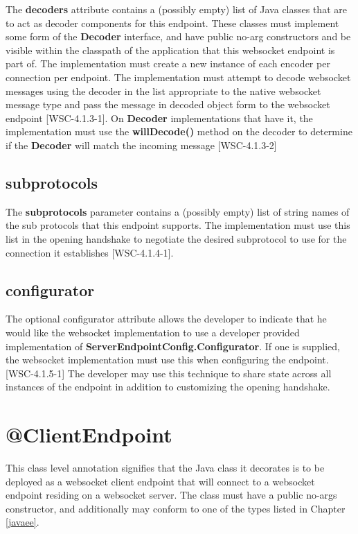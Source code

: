 The \textbf{decoders} attribute contains a (possibly empty) list of Java classes that are to act as decoder components for this endpoint. These classes must implement some form of the \textbf{Decoder} interface, and have public no-arg constructors and be visible within the classpath of the application that this websocket endpoint is part of. The implementation must create a new instance of each encoder per connection per endpoint. The implementation must attempt to decode websocket messages using the decoder in the list appropriate to the native websocket message type and pass the message in decoded object form to the websocket endpoint [WSC-4.1.3-1]. On \textbf{Decoder} implementations that have it, the implementation must use the \textbf{willDecode()} method on the decoder to determine if the \textbf{Decoder} will match the incoming message [WSC-4.1.3-2]

\subsection{subprotocols}

The \textbf{subprotocols} parameter contains a (possibly empty) list of string names of the sub protocols that this endpoint supports. The implementation must use this list in the opening handshake to negotiate the desired subprotocol to use for the connection it establishes [WSC-4.1.4-1].

\subsection{configurator}

The optional configurator attribute allows the developer to indicate that he would like the websocket implementation to use a developer provided implementation of \textbf{ServerEndpointConfig.Configurator}. If one is supplied, the websocket implementation must use this when configuring the endpoint. [WSC-4.1.5-1] The developer may use this technique to share state across all instances of the endpoint in addition to customizing the opening handshake.

\section{@ClientEndpoint}

This class level annotation signifies that the Java class it decorates is to be deployed as a websocket client endpoint that will connect to a websocket endpoint residing on a websocket server. The class must have a public no-args constructor, and additionally may conform to one of the types listed in Chapter \ref{javaee}.

